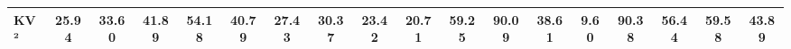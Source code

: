 \documentclass[11pt]{article}
\begin{document}
\begin{table}[htbp]
\begin{tabular}{l|ccc|ccc|ccc|ccc|cc|cc|c}
KV²
    & \textbf{25.94} & \textbf{33.60} & 41.89
    & \textbf{54.18} & \textbf{40.79} & \textbf{27.43}
    & 30.37 & \textbf{23.42} & 20.71
    & \textbf{59.25} & \textbf{90.09} & \textbf{38.61}
    & 9.60 & \textbf{90.38}
    & \textbf{56.44} & 59.58
    & \textbf{43.89} \\

\bottomrule
\end{tabular}

\end{table}

\end{document}
